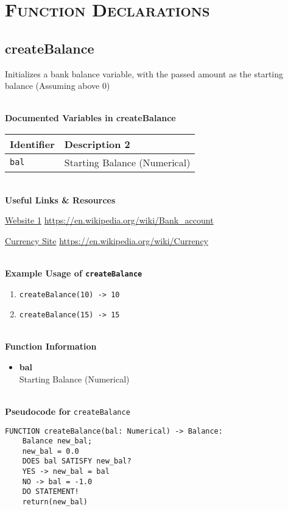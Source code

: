 
\section{\textsc{Function Declarations}}
\clearpage

\subsection{createBalance}
Initializes a bank balance variable, with the passed amount as the starting balance (Assuming above 0)

\textbf{ \\ Documented Variables in createBalance}
\begin{table}[htbp]
	\centering
	\begin{tabular}{|l|l|}
		\hline
		Identifier & Description 2 \\
		\hline
		 \texttt{bal} & Starting Balance (Numerical) \\
		\hline
	\end{tabular}
\end{table}

 \textbf{ \\ Useful Links \& Resources}

\href{https://en.wikipedia.org/wiki/Bank_account}{Website 1} \hfill \url{https://en.wikipedia.org/wiki/Bank_account} 

\href{https://en.wikipedia.org/wiki/Currency}{Currency Site} \hfill \url{https://en.wikipedia.org/wiki/Currency} 

\textbf{ \\ Example Usage of \texttt{createBalance}}
\begin{enumerate}
	\setlength{\itemsep}{0pt}
	\setlength{\parskip}{0pt}
	\setlength{\parsep}{0pt}
	\item \verb|createBalance(10) -> 10|
	\item \verb|createBalance(15) -> 15|
\end{enumerate}

\textbf{ \\ Function Information}
\begin{itemize}
	\setlength{\itemsep}{0pt}
	\setlength{\parskip}{0pt}
	\setlength{\parsep}{0pt}
	\item \textbf{bal} \\ Starting Balance (Numerical)
\end{itemize}

\textbf{\\ Pseudocode for } \texttt{createBalance}
\begin{verbatim}
FUNCTION createBalance(bal: Numerical) -> Balance:
	Balance new_bal;
	new_bal = 0.0
	DOES bal SATISFY new_bal?
	YES -> new_bal = bal
	NO -> bal = -1.0
	DO STATEMENT!
	return(new_bal)
\end{verbatim}

